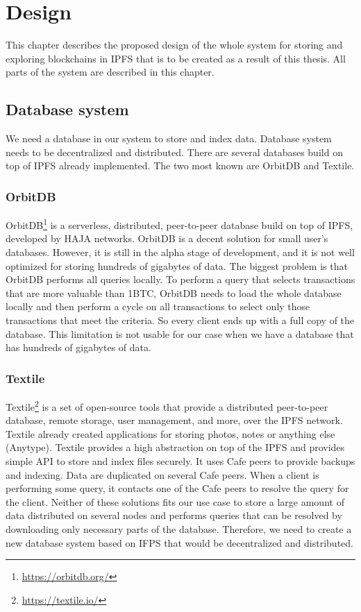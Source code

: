 \chapter{Design}
\label{Design}
This chapter describes the proposed design of the whole system for storing and exploring blockchains in IPFS that is to be created as a result of this thesis. All parts of the system are described in this chapter.

\section{Database system}
We need a database in our system to store and index data. Database system needs to be decentralized and distributed. There are several databases build on top of IPFS already implemented. The two most known are OrbitDB and Textile.

\subsection{OrbitDB}
OrbitDB\footnote{\url{https://orbitdb.org/}} is a serverless, distributed, peer-to-peer database build on top of IPFS, developed by HAJA networks. OrbitDB is a decent solution for small user's databases. However, it is still in the alpha stage of development, and it is not well optimized for storing hundreds of gigabytes of data. The biggest problem is that OrbitDB performs all queries locally. To perform a query that selects transactions that are more valuable than 1BTC, OrbitDB needs to load the whole database locally and then perform a cycle on all transactions to select only those transactions that meet the criteria. So every client ends up with a full copy of the database. This limitation is not usable for our case when we have a database that has hundreds of gigabytes of data.\cite{OrbitDBManual}

\subsection{Textile}
Textile\footnote{\url{https://textile.io/}} is a set of open-source tools that provide a distributed peer-to-peer database, remote storage, user management, and more, over the IPFS network. Textile already created applications for storing photos, notes or anything else (Anytype). Textile provides a high abstraction on top of the IPFS and provides simple API to store and index files securely. It uses Cafe peers to provide backups and indexing. Data are duplicated on several Cafe peers. When a client is performing some query, it contacts one of the Cafe peers to resolve the query for the client.
Neither of these solutions fits our use case to store a large amount of data distributed on several nodes and performs queries that can be resolved by downloading only necessary parts of the database. Therefore, we need to create a new database system based on IFPS that would be decentralized and distributed.\cite{TextileWhitePaper}

